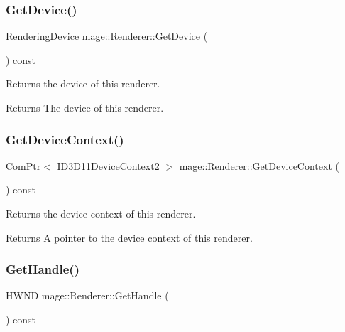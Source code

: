 \subsubsection{\texorpdfstring{Get\+Device()}{GetDevice()}}
{\footnotesize\ttfamily \hyperlink{classmage_1_1_rendering_device}{Rendering\+Device} mage\+::\+Renderer\+::\+Get\+Device (\begin{DoxyParamCaption}{ }\end{DoxyParamCaption}) const}

Returns the device of this renderer.

\begin{DoxyReturn}{Returns}
The device of this renderer. 
\end{DoxyReturn}
\hypertarget{classmage_1_1_renderer_a764ee3d8f3dea6aceb05f42bce80b147}{}\label{classmage_1_1_renderer_a764ee3d8f3dea6aceb05f42bce80b147} 
\subsubsection{\texorpdfstring{Get\+Device\+Context()}{GetDeviceContext()}}
{\footnotesize\ttfamily \hyperlink{namespacemage_ae74f374780900893caa5555d1031fd79}{Com\+Ptr}$<$ I\+D3\+D11\+Device\+Context2 $>$ mage\+::\+Renderer\+::\+Get\+Device\+Context (\begin{DoxyParamCaption}{ }\end{DoxyParamCaption}) const}

Returns the device context of this renderer.

\begin{DoxyReturn}{Returns}
A pointer to the device context of this renderer. 
\end{DoxyReturn}
\hypertarget{classmage_1_1_renderer_a11d47495a47c58a0f67aae3110f9f519}{}\label{classmage_1_1_renderer_a11d47495a47c58a0f67aae3110f9f519} 
\subsubsection{\texorpdfstring{Get\+Handle()}{GetHandle()}}
{\footnotesize\ttfamily H\+W\+ND mage\+::\+Renderer\+::\+Get\+Handle (\begin{DoxyParamCaption}{ }\end{DoxyParamCaption}) const}


